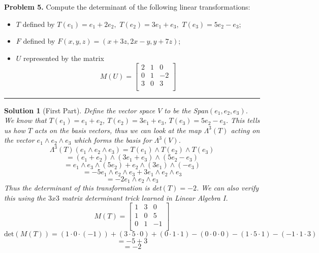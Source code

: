 \documentclass[leqno]{article}
\theoremstyle{nonumberplain}
\newtheorem{solution}{Solution}
\begin{document}
\noindent\textbf{Problem 5.} Compute the determinant of the following linear transformations:
\begin{itemize}
  \item  $T$ defined by $T(e_1) = e_1 +2e_2, \textrm{~} T(e_2) = 3e_1 + e_3, \textrm{~} T(e_3) = 5e_2 - e_3$;
  \item  $F$ defined by $F(x,y,z) = (x +3z,2x-y,y+7z)$;
  \item $U$ represented by the matrix
  \[
  M(U)=
  \begin{bmatrix}
  2 & 1 & 0\\
  0 & 1 & -2\\
  3 & 0 & 3\\
  \end{bmatrix}
  \]
\end{itemize}

\noindent\rule[0.5ex]{\linewidth}{1pt}

\begin{solution}[First Part]
Define the vector space $V$ to be the Span$(e_1,e_2,e_3)$. We know that $T(e_1)=e_1+e_2$, $T(e_2)=3e_1+e_3$, $T(e_3)=5e_2-e_3$.  This tells us how $T$ acts on the basis vectors, thus we can look at the map $\Lambda^3(T)$ acting on the vector $e_1 \wedge e_2 \wedge e_3$ which forms the basis for $\Lambda^3(V)$.
\[
\Lambda^3(T)(e_1 \wedge e_2 \wedge e_3) = T(e_1) \wedge T(e_2) \wedge T(e_3)
\] 
\[
=(e_1 + e_2) \wedge (3e_1 + e_3) \wedge (5e_2 - e_3)
\] 
\[
=e_1 \wedge e_3 \wedge (5e_2) + e_2 \wedge (3e_1) \wedge (-e_3)
\]
\[
=-5e_1 \wedge e_2 \wedge e_3 + 3e_1 \wedge e_2 \wedge e_3
\]
\[
=-2e_1 \wedge e_2 \wedge e_3
\]
Thus the determinant of this transformation is det$(T)=-2$.  We can also verify this using the $3x3$ matrix determinant trick learned in Linear Algebra I.
\[
  M(T)=
  \begin{bmatrix}
  1 & 3 & 0\\
  1 & 0 & 5\\
  0 & 1 & -1\\
  \end{bmatrix} 
\]
\[
\textrm{det}(M(T))=(1\cdot 0 \cdot (-1))+(3 \cdot 5 \cdot 0) + (0 \cdot 1 \cdot 1) - (0 \cdot 0 \cdot 0) - (1 \cdot 5 \cdot 1) - (-1 \cdot 1 \cdot 3)
\]
\[
=-5+3
\]
\[
=-2
\]
\end{solution}
\end{document}

